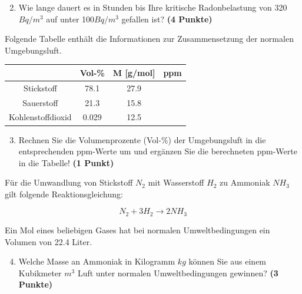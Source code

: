 \documentclass[a4paper, 10pt]{scrartcl}\usepackage[]{graphicx}\usepackage[]{xcolor}
\begin{document}
\begin{enumerate}
  \setcounter{enumi}{1}
\item Wie lange dauert es in Stunden bis Ihre kritische Radonbelastung von
  320$Bq/m^3$ auf unter 100$Bq/m^3$ gefallen ist?
  \textbf{(4 Punkte)}
\end{enumerate}

Folgende Tabelle enth{\"a}lt die Informationen zur Zusammensetzung der
normalen Umgebungsluft.

\begin{center}
  \begin{tabular}{ c|c|c|c }
     & Vol-\% & M [g/mol] & ppm \\
    \hline
    Stickstoff & 78.1 & 27.9 &
                                                    \phantom{1000000000000}\strut\\
        \hline
    Sauerstoff & 21.3 & 15.8 &
                                                    \phantom{10000000}\strut\\
        \hline
    Kohlenstoffdioxid & 0.029 & 12.5 & \phantom{10000000}\strut\\     
     \hline
\end{tabular}
\end{center}

\begin{enumerate}
   \setcounter{enumi}{2}
\item Rechnen Sie die Volumenprozente (Vol-\%) der Umgebungsluft in die
  entsprechenden ppm-Werte um und erg{\"a}nzen Sie die berechneten ppm-Werte in
  die Tabelle!  \textbf{(1 Punkt)}
\end{enumerate}

F{\"u}r die Umwandlung von Stickstoff $N_2$ mit Wasserstoff $H_2$ zu Ammoniak
$NH_3$ gilt folgende Reaktionsgleichung:

\begin{equation*}
  N_2 + 3H_2 \rightarrow 2NH_3
\end{equation*}  

Ein Mol eines beliebigen Gases hat bei normalen Umweltbedingungen ein
Volumen von 22.4 Liter. %

\begin{enumerate}
  \setcounter{enumi}{3}
\item Welche Masse an Ammoniak in Kilogramm $kg$ k{\"o}nnen Sie aus einem
  Kubikmeter $m^3$ Luft unter normalen Umweltbedingungen gewinnen?
  \textbf{(3 Punkte)}
\end{enumerate}
\end{document}
